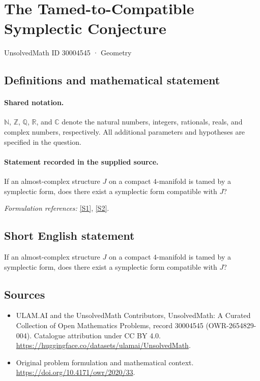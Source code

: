 \documentclass[11pt]{article}
\newcommand{\sref}[2]{\hyperlink{source:#1:#2}{[S#2]}}
\begin{document}
\setcounter{section}{30004544}
\section{The Tamed-to-Compatible Symplectic Conjecture}\label{30004545}
{\small UnsolvedMath ID 30004545 · Geometry}
\subsection{Definitions and mathematical statement}

\paragraph{Shared notation.}$\mathbb N$, $\mathbb Z$, $\mathbb Q$, $\mathbb R$, and $\mathbb C$ denote the natural numbers, integers, rationals, reals, and complex numbers, respectively. All additional parameters and hypotheses are specified in the question.


\paragraph{Statement recorded in the supplied source.}
If an almost-complex structure $J$ on a compact $4$-manifold is tamed by a symplectic form, does there exist a symplectic form compatible with $J$?
\par\smallskip\textit{Formulation references:} \sref{30004545}{1}, \sref{30004545}{2}.
\subsection{Short English statement}
If an almost-complex structure $J$ on a compact $4$-manifold is tamed by a symplectic form, does there exist a symplectic form compatible with $J$?
\subsection{Sources}
\begin{itemize}
\item[\hypertarget{source:30004545:1}{S1}] ULAM.AI and the UnsolvedMath Contributors, UnsolvedMath: A Curated Collection of Open Mathematics Problems, record 30004545 (OWR-2654829-004). Catalogue attribution under CC BY 4.0.
\url{https://huggingface.co/datasets/ulamai/UnsolvedMath}.
\item[\hypertarget{source:30004545:2}{S2}] Original problem formulation and mathematical context.
\url{https://doi.org/10.4171/owr/2020/33}.
\end{itemize}
\label{end:30004545}
\end{document}
